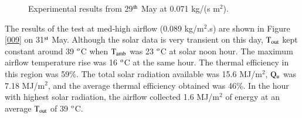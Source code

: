 \begin{figure}[!ht]
\begin{minipage}{0.49\textwidth}
	\end{minipage}
	
	\caption{Experimental results from 29$^{\rm{th}}$ May at 0.071 kg/(s m$^2$).}
	\label{007}
\end{figure}

\newpage
The results of the test at med-high airflow (0.089 kg/m$^2$.s) are shown in Figure \ref{009} on 31$^{\rm{st}}$ May. Although the solar data is very transient on this day, $\rm{T_{out}}$ kept constant around 39 $^{\rm{o}}$C  when $\rm{T_{amb}}$ was 23 $^{\rm{o}}$C at solar noon hour. The maximum airflow temperature rise was 16 $^{\rm{o}}$C at the same hour. The thermal efficiency in this region was 59\%. The total solar radiation available was 15.6 MJ/m$^2$, $\rm{Q_{u}}$ was 7.18 MJ/m$^2$, and the average thermal efficiency obtained was 46\%. In the hour with highest solar radiation, the airflow collected 1.6 MJ/m$^2$ of energy at an average $\rm{T_{out}}$ of 39 $^{\rm{o}}$C.


